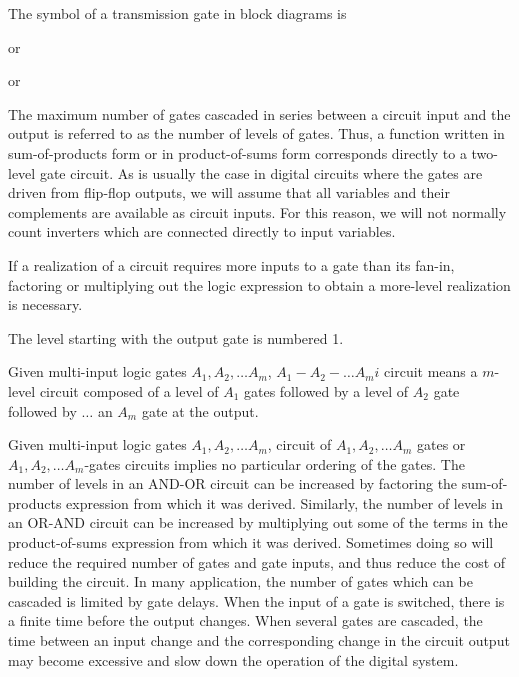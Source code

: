 \documentclass[a4paper,12pt]{report}
\begin{document}
The symbol of a transmission gate in block diagrams is
or
or
The maximum number of gates cascaded in series between a circuit input and the output is referred to as the number of levels of gates. Thus, a function written in sum-of-products form or in product-of-sums form corresponds directly to a two-level gate circuit. As is usually the case in digital circuits where the gates are driven from flip-flop outputs, we will assume that all variables and their complements are available as circuit inputs. For this reason, we will not normally count inverters which are connected directly to input variables.

If a realization of a circuit requires more inputs to a gate than its fan-in, factoring or multiplying out the logic expression to obtain a more-level realization is necessary.

The level starting with the output gate is numbered 1.

Given multi-input logic gates $A_1,A_2,\ldots A_m$, $A_1-A_2-\ldots A_mi$ circuit means a $m$-level circuit composed of a level of $A_1$ gates followed by a level of $A_2$ gate followed by $\ldots$ an $A_m$ gate at the output.

Given multi-input logic gates $A_1,A_2,\ldots A_m$, circuit of $A_1,A_2,\ldots A_m$ gates or $A_1,A_2,\ldots A_m$-gates circuits implies no particular ordering of the gates.
The number of levels in an AND-OR circuit can be increased by factoring the sum-of-products expression from which it was derived. Similarly, the number of levels in an OR-AND circuit can be increased by multiplying out some of the terms in the product-of-sums expression from which it was derived. Sometimes doing so will reduce the required number of gates and gate inputs, and thus reduce the cost of building the circuit. In many application, the number of gates which can be cascaded is limited by gate delays. When the input of a gate is switched, there is a finite time before the output changes. When several gates are cascaded, the time between an input change and the corresponding change in the circuit output may become excessive and slow down the operation of the digital system.
\end{document}
